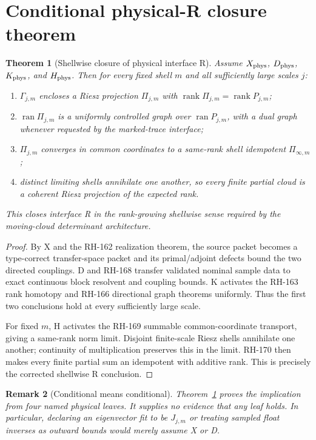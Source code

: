 \documentclass[12pt]{article}
\newtheorem{theorem}{Theorem}
\newtheorem{remark}[theorem]{Remark}
\begin{document}
\section{Conditional physical-R closure theorem}
\begin{theorem}[Shellwise closure of physical interface R]\label{thm:R}
Assume $X_{\rm phys}$, $D_{\rm phys}$, $K_{\rm phys}$, and
$H_{\rm phys}$.  Then for every fixed shell $m$ and all sufficiently large
scales $j$:
\begin{enumerate}
\item $\Gamma_{j,m}$ encloses a Riesz projection $\Pi_{j,m}$ with
$\operatorname{rank}\Pi_{j,m}=\operatorname{rank}P_{j,m}$;
\item $\operatorname{ran}\Pi_{j,m}$ is a uniformly controlled graph over
$\operatorname{ran}P_{j,m}$, with a dual graph whenever requested by the
marked-trace interface;
\item $\Pi_{j,m}$ converges in common coordinates to a same-rank shell
idempotent $\Pi_{\infty,m}$;
\item distinct limiting shells annihilate one another, so every finite
partial cloud is a coherent Riesz projection of the expected rank.
\end{enumerate}
This closes interface R in the rank-growing shellwise sense required by the
moving-cloud determinant architecture.
\end{theorem}
\begin{proof}
By X and the RH-162 realization theorem, the source packet becomes a
type-correct transfer-space packet and its primal/adjoint defects bound the
two directed couplings.  D and RH-168 transfer validated nominal sample data
to exact continuous block resolvent and coupling bounds.  K activates the
RH-163 rank homotopy and RH-166 directional graph theorems uniformly.  Thus
the first two conclusions hold at every sufficiently large scale.

For fixed $m$, H activates the RH-169 summable common-coordinate transport,
giving a same-rank norm limit.  Disjoint finite-scale Riesz shells annihilate
one another; continuity of multiplication preserves this in the limit.
RH-170 then makes every finite partial sum an idempotent with additive rank.
This is precisely the corrected shellwise R conclusion.
\end{proof}

\begin{remark}[Conditional means conditional]
Theorem~\ref{thm:R} proves the implication from four named physical leaves.
It supplies no evidence that any leaf holds.  In particular, declaring an
eigenvector fit to be $J_{j,m}$ or treating sampled float inverses as outward
bounds would merely assume X or D.
\end{remark}
\end{document}

